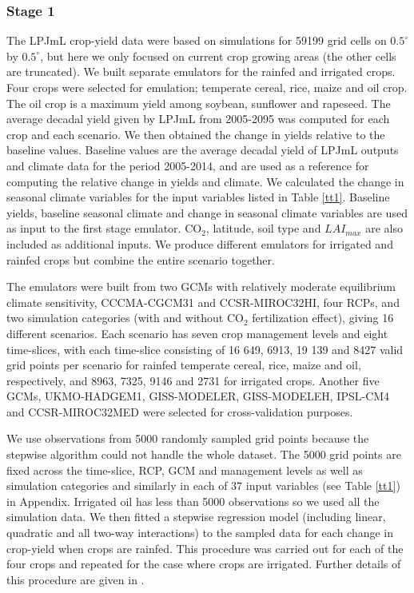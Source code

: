 \subsubsection{Stage 1}
The LPJmL crop-yield data were based on simulations for 59199 grid cells on $0.5^{\circ}$ by $0.5^{\circ}$, but here we only focused on current crop growing areas (the other cells are truncated).
We built separate emulators for the rainfed and irrigated crops. Four crops were selected for emulation; temperate cereal, rice, maize and oil crop. The oil crop is a maximum yield among soybean, sunflower and rapeseed. 
The average decadal yield given by LPJmL from 2005-2095 was computed for each crop and each scenario. We then obtained the change in yields relative to the baseline values. Baseline values are the average decadal yield of LPJmL outputs and climate data for the period 2005-2014, and are used as a reference for computing the relative change in yields and climate. We calculated the change in seasonal climate variables for the input variables listed in Table \ref{tt1}. Baseline yields, baseline seasonal climate and change in seasonal climate variables are used as input to the first stage emulator. CO$_2$, latitude, soil type and $LAI_{max}$ are also included as additional inputs. We produce different emulators for irrigated and rainfed crops but combine the entire scenario together.

The emulators were built from two GCMs with relatively moderate equilibrium climate sensitivity, CCCMA-CGCM31 and CCSR-MIROC32HI, four RCPs, and two simulation categories (with and without CO$_2$ fertilization effect), giving 16 different scenarios. Each scenario has seven crop management levels and eight time-slices, with each time-slice consisting of 16 649, 6913, 19 139 and 8427 valid grid points per scenario for rainfed temperate cereal, rice, maize and oil, respectively, and 8963, 7325, 9146 and 2731 for irrigated crops. Another five GCMs, UKMO-HADGEM1, GISS-MODELER, GISS-MODELEH, IPSL-CM4 and CCSR-MIROC32MED were selected for cross-validation purposes. 

We use observations from 5000 randomly sampled grid points because the stepwise algorithm could not handle the whole dataset. The 5000 grid points are fixed across the time-slice, RCP, GCM and management levels as well as simulation categories and similarly in each of 37 input variables (see Table \ref{tt1}) in Appendix. Irrigated oil has less than 5000 observations so we used all the simulation data. We then fitted a stepwise regression model (including linear, quadratic and all two-way interactions) to the sampled data for each change in crop-yield when crops are rainfed. This procedure was carried out for each of the four crops and repeated for the case where crops are irrigated. Further details of this procedure are given in \citep{qwole}.


